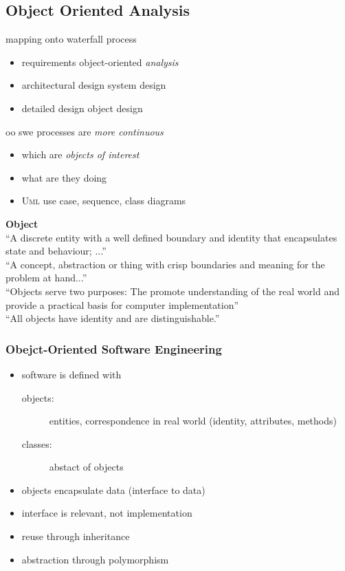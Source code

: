 \documentclass[a4paper, 10pt]{article}
\begin{document}
\subsection{Object Oriented Analysis}
mapping onto waterfall process
\begin{itemize}
	\item requirements \follows object-oriented \emph{analysis}
	\item architectural design \follows system design
	\item detailed design \follows object design
\end{itemize}
oo swe processes are \emph{more continuous}
\begin{itemize}
	\item which are \emph{objects of interest}
	\item what are they doing
	\item \textsc{Uml} use case, sequence, class diagrams
\end{itemize}

\begin{shaded}
\textbf{Object} \\
``A discrete entity with a well defined boundary and identity that encapsulates state and behaviour; ...'' \\
``A concept, abstraction or thing with crisp boundaries and meaning for the problem at hand...''\\
``Objects serve two purposes: The promote understanding of the real world and provide a practical basis for computer implementation'' \\
``All objects have identity and are distinguishable.''
\end{shaded}

\subsubsection{Obejct-Oriented Software Engineering}
\begin{itemize}
	\item software is defined with
	\begin{description}
		\item[objects:] entities, correspondence in real world (identity, attributes, methods)
		\item[classes:] abstact of objects
	\end{description}
	\item objects encapsulate data (interface to data)
	\item interface is relevant, not implementation
	\item reuse through inheritance
	\item abstraction through polymorphism
\end{itemize}
\end{document}
